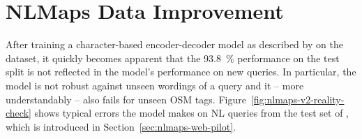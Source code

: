 \chapter{NLMaps Data Improvement}
\label{ch:nlmaps-improvement}

After training a character-based encoder-decoder model as described by
\textcite{staniek-2020} on the \nlmapstwo{} dataset, it quickly becomes apparent
that the \SI{93.8}{\%} performance on the test split is not reflected in the
model’s performance on new queries. In particular, the model is not robust
against unseen wordings of a query and it – more understandably – also fails for
unseen OSM tags. Figure~\ref{fig:nlmaps-v2-reality-check} shows typical errors
the model makes on NL queries from the test set of \nlmapswebpilot{}, which is
introduced in Section~\ref{sec:nlmaps-web-pilot}.

